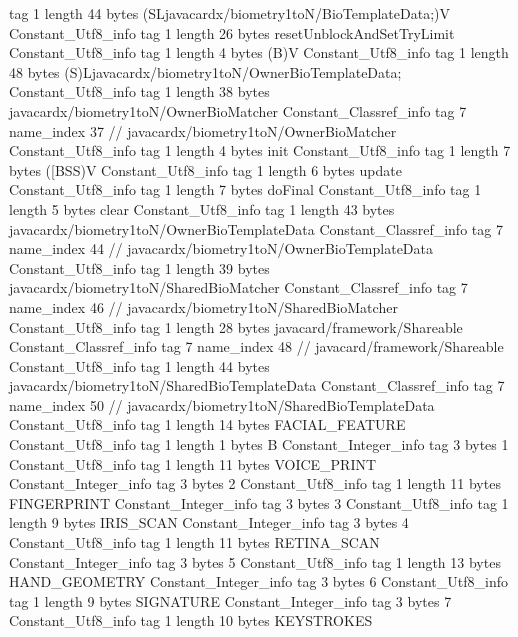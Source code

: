 {{{			tag	1
			length	44
			bytes	(SLjavacardx/biometry1toN/BioTemplateData;)V
		}
		Constant_Utf8_info {
			tag	1
			length	26
			bytes	resetUnblockAndSetTryLimit
		}
		Constant_Utf8_info {
			tag	1
			length	4
			bytes	(B)V
		}
		Constant_Utf8_info {
			tag	1
			length	48
			bytes	(S)Ljavacardx/biometry1toN/OwnerBioTemplateData;
		}
		Constant_Utf8_info {
			tag	1
			length	38
			bytes	javacardx/biometry1toN/OwnerBioMatcher
		}
		Constant_Classref_info {
			tag	7
			name_index	37		// javacardx/biometry1toN/OwnerBioMatcher
		}
		Constant_Utf8_info {
			tag	1
			length	4
			bytes	init
		}
		Constant_Utf8_info {
			tag	1
			length	7
			bytes	([BSS)V
		}
		Constant_Utf8_info {
			tag	1
			length	6
			bytes	update
		}
		Constant_Utf8_info {
			tag	1
			length	7
			bytes	doFinal
		}
		Constant_Utf8_info {
			tag	1
			length	5
			bytes	clear
		}
		Constant_Utf8_info {
			tag	1
			length	43
			bytes	javacardx/biometry1toN/OwnerBioTemplateData
		}
		Constant_Classref_info {
			tag	7
			name_index	44		// javacardx/biometry1toN/OwnerBioTemplateData
		}
		Constant_Utf8_info {
			tag	1
			length	39
			bytes	javacardx/biometry1toN/SharedBioMatcher
		}
		Constant_Classref_info {
			tag	7
			name_index	46		// javacardx/biometry1toN/SharedBioMatcher
		}
		Constant_Utf8_info {
			tag	1
			length	28
			bytes	javacard/framework/Shareable
		}
		Constant_Classref_info {
			tag	7
			name_index	48		// javacard/framework/Shareable
		}
		Constant_Utf8_info {
			tag	1
			length	44
			bytes	javacardx/biometry1toN/SharedBioTemplateData
		}
		Constant_Classref_info {
			tag	7
			name_index	50		// javacardx/biometry1toN/SharedBioTemplateData
		}
		Constant_Utf8_info {
			tag	1
			length	14
			bytes	FACIAL_FEATURE
		}
		Constant_Utf8_info {
			tag	1
			length	1
			bytes	B
		}
		Constant_Integer_info {
			tag	3
			bytes	1
		}
		Constant_Utf8_info {
			tag	1
			length	11
			bytes	VOICE_PRINT
		}
		Constant_Integer_info {
			tag	3
			bytes	2
		}
		Constant_Utf8_info {
			tag	1
			length	11
			bytes	FINGERPRINT
		}
		Constant_Integer_info {
			tag	3
			bytes	3
		}
		Constant_Utf8_info {
			tag	1
			length	9
			bytes	IRIS_SCAN
		}
		Constant_Integer_info {
			tag	3
			bytes	4
		}
		Constant_Utf8_info {
			tag	1
			length	11
			bytes	RETINA_SCAN
		}
		Constant_Integer_info {
			tag	3
			bytes	5
		}
		Constant_Utf8_info {
			tag	1
			length	13
			bytes	HAND_GEOMETRY
		}
		Constant_Integer_info {
			tag	3
			bytes	6
		}
		Constant_Utf8_info {
			tag	1
			length	9
			bytes	SIGNATURE
		}
		Constant_Integer_info {
			tag	3
			bytes	7
		}
		Constant_Utf8_info {
			tag	1
			length	10
			bytes	KEYSTROKES
}}}
